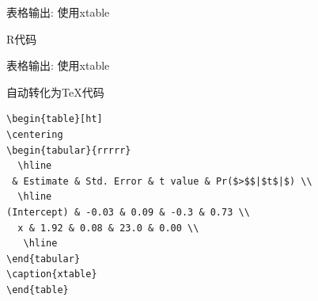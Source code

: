 \documentclass[
  12pt,
  ignorenonframetext,
  aspectratio=169, 12pt,table,t,utf-8]{beamer}
\newenvironment{Shaded}{\begin{snugshade}}{\end{snugshade}}
\newcommand{\AttributeTok}[1]{\textcolor[rgb]{0.77,0.63,0.00}{#1}}
\newcommand{\DecValTok}[1]{\textcolor[rgb]{0.00,0.00,0.81}{#1}}
\newcommand{\FunctionTok}[1]{\textcolor[rgb]{0.00,0.00,0.00}{#1}}
\newcommand{\NormalTok}[1]{#1}
\newcommand{\OtherTok}[1]{\textcolor[rgb]{0.56,0.35,0.01}{#1}}
\newcommand{\SpecialCharTok}[1]{\textcolor[rgb]{0.00,0.00,0.00}{#1}}
\begin{document}
\begin{frame}[fragile]{表格输出: 使用xtable}
\protect\hypertarget{ux8868ux683cux8f93ux51fa-ux4f7fux7528xtable}{}
\begin{block}{R代码}
\protect\hypertarget{rux4ee3ux7801-1}{}
\begin{Shaded}
\end{Shaded}
\end{block}
\end{frame}

\begin{frame}[fragile]{表格输出: 使用xtable}
\protect\hypertarget{ux8868ux683cux8f93ux51fa-ux4f7fux7528xtable-1}{}
\begin{block}{自动转化为\TeX{}代码}
\protect\hypertarget{ux81eaux52a8ux8f6cux5316ux4e3aux4ee3ux7801}{}
\small

\begin{verbatim}
\begin{table}[ht]
\centering
\begin{tabular}{rrrrr}
  \hline
 & Estimate & Std. Error & t value & Pr($>$$|$t$|$) \\ 
  \hline
(Intercept) & -0.03 & 0.09 & -0.3 & 0.73 \\ 
  x & 1.92 & 0.08 & 23.0 & 0.00 \\ 
   \hline
\end{tabular}
\caption{xtable} 
\end{table}
\end{verbatim}
\end{block}
\end{frame}
\end{document}
